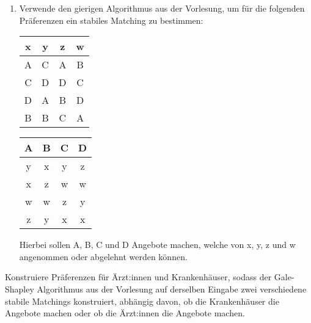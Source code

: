 \documentclass{uebung_cs}
\begin{document}
\begin{aufgabe}
\begin{enumerate}
\begin{center}
        \end{center}
        \item Verwende den gierigen Algorithmus aus der Vorlesung, um für die folgenden Präferenzen ein stabiles Matching zu bestimmen:
        \begin{center}
            \begin{tabular}{c|c|c|c}
                x & y & z & w \\ \hline
                A & C & A & B \\
                C & D & D & C \\
                D & A & B & D \\
                B & B & C & A
            \end{tabular}
            \hspace{1cm}
            \begin{tabular}{c|c|c|c}
                A & B & C & D \\ \hline
                y & x & y & z \\
                x & z & w & w \\
                w & w & z & y \\
                z & y & x & x
            \end{tabular}
        \end{center}
        Hierbei sollen A, B, C und D Angebote machen, welche von x, y, z und w angenommen oder abgelehnt werden können.
    \end{enumerate}
\end{aufgabe}

\begin{aufgabe}
    Konstruiere Präferenzen für Ärzt:innen und Krankenhäuser, sodass der Gale-Shapley Algorithmus aus der Vorlesung auf derselben Eingabe zwei verschiedene stabile Matchings konstruiert, abhängig davon, ob die Krankenhäuser die Angebote machen oder ob die Ärzt:innen die Angebote machen. 
\end{aufgabe}
\end{document}
